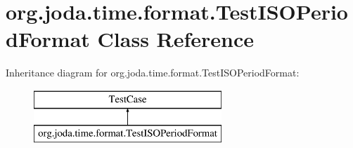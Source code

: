 \hypertarget{classorg_1_1joda_1_1time_1_1format_1_1_test_i_s_o_period_format}{\section{org.\-joda.\-time.\-format.\-Test\-I\-S\-O\-Period\-Format Class Reference}
\label{classorg_1_1joda_1_1time_1_1format_1_1_test_i_s_o_period_format}
}
Inheritance diagram for org.\-joda.\-time.\-format.\-Test\-I\-S\-O\-Period\-Format\-:\begin{figure}[H]
\begin{center}
\leavevmode
\includegraphics[height=2.000000cm]{classorg_1_1joda_1_1time_1_1format_1_1_test_i_s_o_period_format}
\end{center}
\end{figure}
